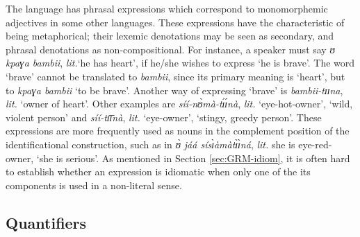 \begin{exe}
\begin{exe}
\begin{exe}
{\begin{exe}
\begin{exe}
\begin{exe}
\begin{exe}
\begin{exe}
\begin{exe}
\begin{exe}
\begin{xlist}
\begin{exe}
The language has phrasal expressions which correspond to  monomorphemic
adjectives in some other languages. These expressions have the characteristic of
being metaphorical; their lexemic denotations may be seen as secondary, and
phrasal  denotations as non-compositional. For instance, a speaker must say 
{\it ʊ kpaɣa bambii}, {\it lit.}`he has heart', if he/she wishes to express `he 
is
brave'. The word `brave' cannot be translated to {\it bambii}, since its primary
meaning is `heart',  but to {\it kpaɣa bambii}  `to be brave'. Another way of
expressing `brave'  is {\it bambii-tɪɪna}, {\it lit.} `owner of heart'. Other
examples  are {\it síí-nʊ̀mà-tɪ́ɪ́nà}, {\it lit.} `eye-hot-owner', `wild,
violent  person'   and {\it síí-tɪ̄ɪ̄nà}, {\it lit.} `eye-owner', `stingy,
greedy person'. These expressions are more frequently used as nouns in the
complement position of the identificational construction, such as in {\it ʊ̀
jáá sísɪ̀àmàtɪ̀ɪ̀ná}, {\it lit.} she is eye-red-owner, `she is serious'.
As mentioned in Section \ref{sec:GRM-idiom},  it is often hard to establish
whether an expression is idiomatic when only one of the its components
is used in a non-literal sense.



% 
% 




\subsection{Quantifiers}
\label{sec:GRM-quantifier}


\end{exe}
\end{xlist}
\end{exe}
\end{exe}
\end{exe}
\end{exe}
\end{exe}
\end{exe}
\end{exe}}
\end{exe}
\end{exe}
\end{exe}
